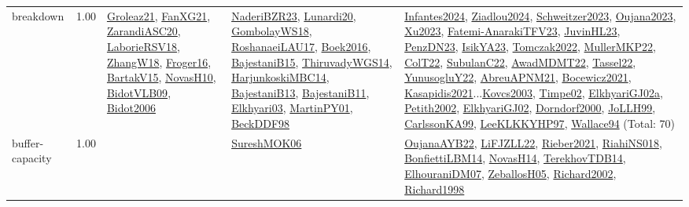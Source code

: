 {\begin{longtable}{p{3cm}r>{\raggedright\arraybackslash}p{6cm}>{\raggedright\arraybackslash}p{6cm}>{\raggedright\arraybackslash}p{8cm}}
\index{breakdown}\index{Concepts!breakdown}breakdown &  1.00 & \hyperref[detail:Groleaz21]{Groleaz21}, \hyperref[detail:FanXG21]{FanXG21}, \hyperref[detail:ZarandiASC20]{ZarandiASC20}, \hyperref[detail:LaborieRSV18]{LaborieRSV18}, \hyperref[detail:ZhangW18]{ZhangW18}, \hyperref[detail:Froger16]{Froger16}, \hyperref[detail:BartakV15]{BartakV15}, \hyperref[detail:NovasH10]{NovasH10}, \hyperref[detail:BidotVLB09]{BidotVLB09}, \hyperref[detail:Bidot2006]{Bidot2006} & \hyperref[detail:NaderiBZR23]{NaderiBZR23}, \hyperref[detail:Lunardi20]{Lunardi20}, \hyperref[detail:GombolayWS18]{GombolayWS18}, \hyperref[detail:RoshanaeiLAU17]{RoshanaeiLAU17}, \hyperref[detail:Boek2016]{Boek2016}, \hyperref[detail:BajestaniB15]{BajestaniB15}, \hyperref[detail:ThiruvadyWGS14]{ThiruvadyWGS14}, \hyperref[detail:HarjunkoskiMBC14]{HarjunkoskiMBC14}, \hyperref[detail:BajestaniB13]{BajestaniB13}, \hyperref[detail:BajestaniB11]{BajestaniB11}, \hyperref[detail:Elkhyari03]{Elkhyari03}, \hyperref[detail:MartinPY01]{MartinPY01}, \hyperref[detail:BeckDDF98]{BeckDDF98} & \hyperref[detail:Infantes2024]{Infantes2024}, \hyperref[detail:Ziadlou2024]{Ziadlou2024}, \hyperref[detail:Schweitzer2023]{Schweitzer2023}, \hyperref[detail:Oujana2023]{Oujana2023}, \hyperref[detail:Xu2023]{Xu2023}, \hyperref[detail:Fatemi-AnarakiTFV23]{Fatemi-AnarakiTFV23}, \hyperref[detail:JuvinHL23]{JuvinHL23}, \hyperref[detail:PenzDN23]{PenzDN23}, \hyperref[detail:IsikYA23]{IsikYA23}, \hyperref[detail:Tomczak2022]{Tomczak2022}, \hyperref[detail:MullerMKP22]{MullerMKP22}, \hyperref[detail:ColT22]{ColT22}, \hyperref[detail:SubulanC22]{SubulanC22}, \hyperref[detail:AwadMDMT22]{AwadMDMT22}, \hyperref[detail:Tassel22]{Tassel22}, \hyperref[detail:YunusogluY22]{YunusogluY22}, \hyperref[detail:AbreuAPNM21]{AbreuAPNM21}, \hyperref[detail:Bocewicz2021]{Bocewicz2021}, \hyperref[detail:Kasapidis2021]{Kasapidis2021}...\hyperref[detail:Kovcs2003]{Kovcs2003}, \hyperref[detail:Timpe02]{Timpe02}, \hyperref[detail:ElkhyariGJ02a]{ElkhyariGJ02a}, \hyperref[detail:Petith2002]{Petith2002}, \hyperref[detail:ElkhyariGJ02]{ElkhyariGJ02}, \hyperref[detail:Dorndorf2000]{Dorndorf2000}, \hyperref[detail:JoLLH99]{JoLLH99}, \hyperref[detail:CarlssonKA99]{CarlssonKA99}, \hyperref[detail:LeeKLKKYHP97]{LeeKLKKYHP97}, \hyperref[detail:Wallace94]{Wallace94} (Total: 70)\\
\index{buffer-capacity}\index{Concepts!buffer-capacity}buffer-capacity &  1.00 &  & \hyperref[detail:SureshMOK06]{SureshMOK06} & \hyperref[detail:OujanaAYB22]{OujanaAYB22}, \hyperref[detail:LiFJZLL22]{LiFJZLL22}, \hyperref[detail:Rieber2021]{Rieber2021}, \hyperref[detail:RiahiNS018]{RiahiNS018}, \hyperref[detail:BonfiettiLBM14]{BonfiettiLBM14}, \hyperref[detail:NovasH14]{NovasH14}, \hyperref[detail:TerekhovTDB14]{TerekhovTDB14}, \hyperref[detail:ElhouraniDM07]{ElhouraniDM07}, \hyperref[detail:ZeballosH05]{ZeballosH05}, \hyperref[detail:Richard2002]{Richard2002}, \hyperref[detail:Richard1998]{Richard1998}\\

\end{longtable}}

